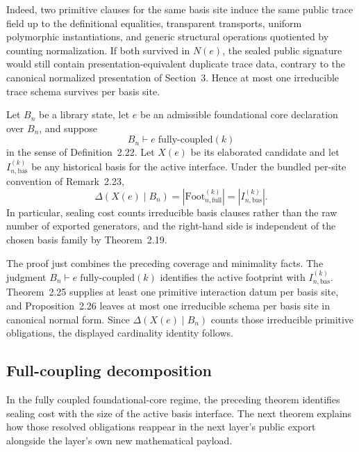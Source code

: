 \documentclass{lmcs}
\begin{document}
Indeed, two primitive clauses for the same basis site induce the same public trace field up to
the definitional equalities, transparent transports, uniform polymorphic instantiations, and
generic structural operations quotiented by counting normalization.  If both survived in
\(N(e)\), the sealed public signature would still contain presentation-equivalent duplicate
trace data, contrary to the canonical normalized presentation of Section~3.  Hence at most one
irreducible trace schema survives per basis site.

\begin{thm}
Let \(B_n\) be a library state, let \(e\) be an admissible foundational core declaration over
\(B_n\), and suppose
\[
  B_n \vdash e\;\mathrm{fully\mbox{-}coupled}(k)
\]
in the sense of Definition~2.22.  Let \(X(e)\) be its elaborated candidate and let
\(I_{n,\mathrm{bas}}^{(k)}\) be any historical basis for the active interface.  Under the bundled
per-site convention of Remark~2.23,
\[
  \Delta(X(e)\mid B_n)
  = |\mathrm{Foot}^{(k)}_{n,\mathrm{full}}|
  = |I_{n,\mathrm{bas}}^{(k)}|.
\]
In particular, sealing cost counts irreducible basis clauses rather than the raw number of
exported generators, and the right-hand side is independent of the chosen basis family by
Theorem~2.19.
\end{thm}

The proof just combines the preceding coverage and minimality facts.  The judgment
\(B_n\vdash e\;\mathrm{fully\mbox{-}coupled}(k)\) identifies the active footprint with
\(I_{n,\mathrm{bas}}^{(k)}\).  Theorem~2.25 supplies at least one primitive interaction datum
per basis site, and Proposition~2.26 leaves at most one irreducible schema per basis site in
canonical normal form.  Since \(\Delta(X(e)\mid B_n)\) counts those irreducible primitive
obligations, the displayed cardinality identity follows.

\subsection{Full-coupling decomposition}

In the fully coupled foundational-core regime, the preceding theorem identifies sealing cost
with the size of the active basis interface.  The next theorem explains how those resolved
obligations reappear in the next layer's public export alongside the layer's own new
mathematical payload.
\end{document}
